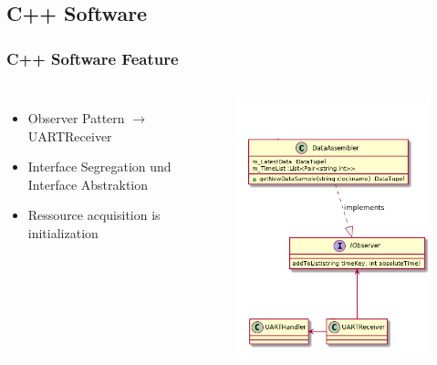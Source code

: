 \subsection{C++ Software}
\begin{frame}
    \frametitle{C++ Software Feature}
    \begin{columns}[c] %
        \begin{itemize}
            \item<1-> Observer Pattern $\rightarrow$ UARTReceiver
            \item<1-> Interface Segregation und Interface Abstraktion
            \item<1-> Ressource acquisition is initialization
        \end{itemize}
        \begin{figure}
            \centering
            \begin{overprint}
                \includegraphics[width=.8\textwidth]{cppfeature_observer.png}

\end{overprint}
\end{figure}
\end{columns}
\end{frame}
